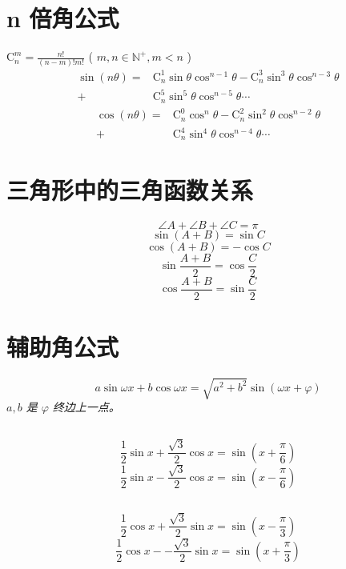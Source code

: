\documentclass[a4paper, fleqn, fontset = mac]{ctexart}
\newcommand{\diform}{\noindent}
\renewcommand{\binom}[2]{\mathrm{C}_{#1}^{#2}}
\begin{document}
\begin{multicols}{2}
		\section{n 倍角公式}
		$ \binom{n}{m} =\frac{n!}{\left( n - m\right)! m!} $
		( $ m, n \in \mathbb{N^+}, m < n $ )
		\begin{align*}
			\sin\left(n\theta\right)
			= & \binom n1\sin\theta\cos^{n-1}\theta
			- \binom n3\sin^{3}\theta\cos^{n-3}\theta \\
			+ & \binom n5\sin^{5}\theta\cos^{n-5}\theta \cdots 
		\end{align*}
		\begin{align*}
			\cos\left(n\theta\right) 
			= & \binom n0\cos^{n}\theta
			- \binom n2\sin^{2}\theta\cos^{n-2}\theta \\
			+ & \binom n4\sin^{4}\theta\cos^{n-4}\theta \cdots
		\end{align*}
		
		\section{三角形中的三角函数关系}
		\diform
		\[\angle A + \angle B + \angle C = \pi \]
		\[ \sin\left (A + B \right ) = \sin C \]
		\[ \cos\left (A + B \right ) = -\cos C \]
		\[ \sin\frac{A + B}{2} = \cos \frac C2 \]
		\[ \cos\frac{A + B}{2} = \sin \frac C2 \]
			
		\section{辅助角公式}
		\diform
		\[ a\sin\omega x + b \cos \omega x
		= \sqrt{a^2 + b^2} \sin \left ( \omega x + \varphi \right ) \]
		\emph{$ a, b $ 是 $\varphi$ 终边上一点。}
		
		\subsection{}
		\diform
		\[ \frac12 \sin x + \frac{\sqrt3} 2 \cos x 
		= \sin \left (x + \frac\pi6\right ) \]
		\[ \frac12 \sin x - \frac{\sqrt3} 2 \cos x 
		= \sin \left (x - \frac\pi6\right ) \]
		\subsection{}
		\diform
		\[ \frac12 \cos x + \frac{\sqrt3} 2 \sin x 
		= \sin \left (x - \frac\pi3\right ) \]
		\[ \frac12 \cos x --\frac{\sqrt3} 2 \sin x 
		= \sin \left (x + \frac\pi3\right ) \]

\end{multicols}
\end{document}
